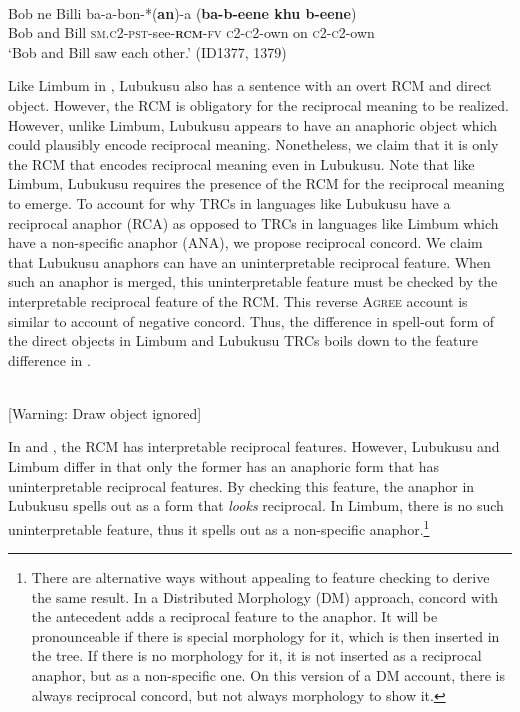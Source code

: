 \documentclass[output=paper]{langsci/langscibook}
\begin{document}
\ea\label{ex:}
\\
\gll Bob  ne  Billi  ba-a-bon-*(\textbf{an})-a     (\textbf{ba-b-eene  khu b-eene}) \\
Bob   and   Bill   \textsc{sm.c2-pst}-see-\textbf{\textsc{rcm}}\textsc{-fv}   \textsc{c2-c2}-own on \textsc{c2-c2}-own \\
\glt ‘Bob and Bill saw each other.’  (ID1377, 1379) 
\z


Like Limbum in , Lubukusu also has a sentence with an overt RCM and direct object. However, the RCM is obligatory for the reciprocal meaning to be realized. However, unlike Limbum, Lubukusu appears to have an anaphoric object which could plausibly encode reciprocal meaning. Nonetheless, we claim that it is only the RCM that encodes reciprocal meaning even in Lubukusu. Note that like Limbum, Lubukusu requires the presence of the RCM for the reciprocal meaning to emerge. To account for why TRCs in languages like Lubukusu have a reciprocal anaphor (RCA) as opposed to TRCs in languages like Limbum which have a non-specific anaphor (ANA), we propose reciprocal concord. We claim that Lubukusu anaphors can have an uninterpretable reciprocal feature. When such an anaphor is merged, this uninterpretable feature must be checked by the interpretable reciprocal feature of the RCM. This reverse \textsc{Agree} account is similar to  account of negative concord. Thus, the difference in spell-out form of the direct objects in Limbum and Lubukusu TRCs boils down to the feature difference in .


\ea\label{ex:}
\ea
{}\\{}
[Warning: Draw object ignored]
\ex
{}
\z
\z

In  and , the RCM has interpretable reciprocal features. However, Lubukusu and Limbum differ in that only the former has an anaphoric form that has uninterpretable reciprocal features. By checking this feature, the anaphor in Lubukusu spells out as a form that \textit{looks} reciprocal. In Limbum, there is no such uninterpretable feature, thus it spells out as a non-specific anaphor.\footnote{There are alternative ways without appealing to feature checking to derive the same result. In a Distributed Morphology (DM) approach, concord with the antecedent adds a reciprocal feature to the anaphor. It will be pronounceable if there is special morphology for it, which is then inserted in the tree. If there is no morphology for it, it is not inserted as a reciprocal anaphor, but as a non-specific one. On this version of a DM account, there is always reciprocal concord, but not always morphology to show it.} 
\end{document}
